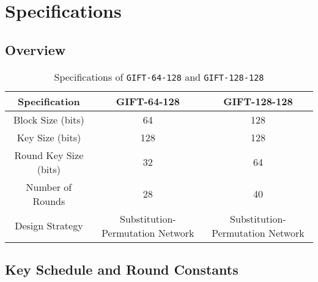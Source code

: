 \chapter{Specifications}

\section*{Overview}

\begin{table}[h]
	\centering
	\begin{tabular}{|c||c|c|}
		\hline
		\textbf{Specification} & \textbf{GIFT-64-128} & \textbf{GIFT-128-128} \\ \hline
		Block Size (bits)      & 64                   & 128                   \\ \hline
		Key Size (bits)        & 128                  & 128                   \\ \hline
		Round Key Size (bits)  & 32                   & 64                    \\ \hline
		Number of Rounds       & 28                   & 40                    \\ \hline
		Design Strategy        & Substitution-Permutation Network & Substitution-Permutation Network \\ \hline
	\end{tabular}
	\caption{Specifications of \texttt{GIFT-64-128} and \texttt{GIFT-128-128}}
	\label{table:gift-specifications}
\end{table}

\newpage
\section{Key Schedule and Round Constants}

\begin{table}[h]\centering\renewcommand{\arraystretch}{1.25}
\caption{Round Constants generated by 6-bit affine LFSR}
\label{table:round-constants}
\end{table}

